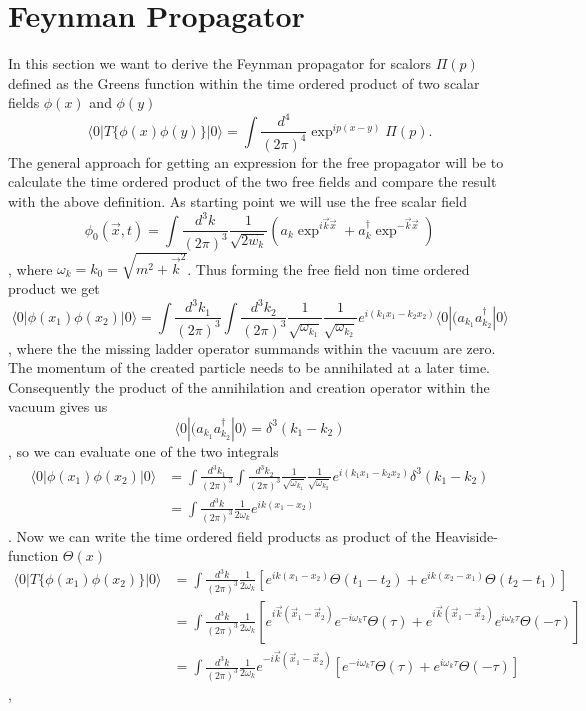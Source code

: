 \section{Feynman Propagator}
In this section we want to derive the Feynman propagator for scalors $\Pi(p)$ defined as the Greens function within the time ordered product of two scalar fields $\phi(x)$ and $\phi(y)$
\begin{equation}
	\langle 0 | T \{ \phi(x) \phi(y) \} | 0 \rangle = \int \frac{d^4}{(2\pi)^4} \exp^{i p (x-y)} \Pi(p).
\end{equation}
The general approach for getting an expression for the free propagator will be to calculate the time ordered product of the two free fields and compare the result with the above definition. 
As starting point we will use the free scalar field
\begin{equation}
	\phi_0(\vec x, t) = \int \frac{d^3 k}{(2\pi)^3} \frac{1}{\sqrt{2 w_k}} (a_k \exp^{i \vec k \vec x} + a_k^\dagger \exp^{-\vec k \vec x} )
\end{equation},
where $\omega_k = k_0 = \sqrt{m^2 + \vec k^2}$. Thus forming the free field non time ordered product we get
\begin{equation}
	\langle 0 | \phi(x_1) \phi(x_2) | 0 \rangle = \int \frac{d^3 k_1}{(2\pi)^3} \int \frac{d^3 k_2}{(2\pi)^3} \frac{1}{\sqrt{\omega_{k_1}}}\frac{1}{\sqrt{\omega_{k_2}}}  e^{i(k_1 x_1-  k_2 x_2)} \langle 0 | (a_{k_1}  a_{k_2}^\dagger | 0 \rangle
\end{equation}, where the the missing ladder operator summands within the vacuum are zero. The momentum of the created particle needs to be annihilated at a later time. Consequently the product of the annihilation and creation operator within the vacuum gives us
\begin{equation}
	\langle 0 | (a_{k_1}  a_{k_2}^\dagger | 0 \rangle = \delta^3(k_1 - k_2)
\end{equation},
so we can evaluate one of the two integrals
\begin{align}
	\langle 0 | \phi(x_1) \phi(x_2) | 0 \rangle &= \int \frac{d^3 k_1}{(2\pi)^3} \int \frac{d^3 k_2}{(2\pi)^3} \frac{1}{\sqrt{\omega_{k_1}}}\frac{1}{\sqrt{\omega_{k_2}}}  e^{i(k_1 x_1-  k_2 x_2)}  \delta^3(k_1 - k_2)  \\
	&= \int \frac{d^3 k}{(2\pi)^3} \frac{1}{2\omega_k} e^{i k(x_1-x_2)}
\end{align}.
Now we can write the time ordered field products as product of the Heaviside-function $\Theta(x)$
\begin{align}
	\langle 0 | T\{\phi(x_1) \phi(x_2) \} | 0 \rangle &= \int \frac{d^3 k}{(2\pi)^3} \frac{1}{2 \omega_k} [ e^{ik(x_1 - x_2)}\Theta(t_1-t_2) + e^{ik(x_2-x_1)} \Theta(t_2 - t_1)]  \\
	&= \int \frac{d^3 k}{(2\pi)^3} \frac{1}{2 \omega_k} [ e^{i\vec k (\vec x_1-\vec x_2)}e^{-i \omega_k \tau} \Theta(\tau) + e^{i\vec k ( \vec x_1 - \vec x_2)} e^{i \omega_k \tau} \Theta(- \tau)]  \\
	&= \int \frac{d^3 k}{(2\pi)^3} \frac{1}{2 \omega_k}  e^{-i\vec k (\vec x_1-\vec x_2)}[e^{-i \omega_k \tau} \Theta(\tau) + e^{i \omega_k \tau} \Theta(- \tau)]  
\end{align},
